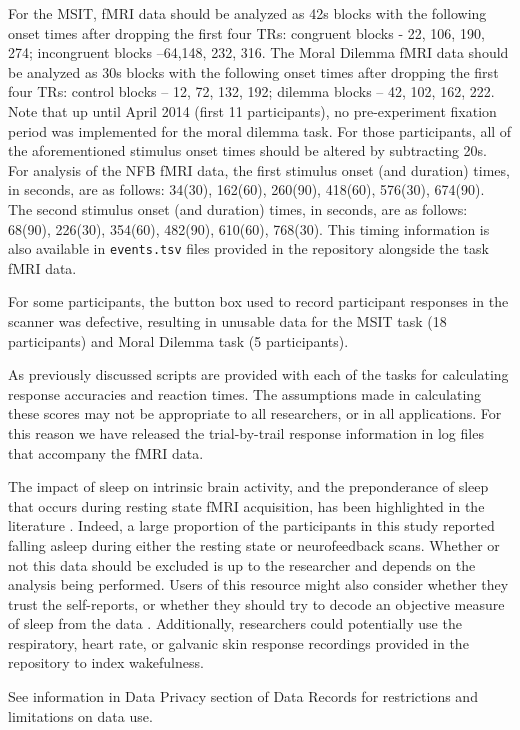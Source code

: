 For the MSIT, fMRI data should be analyzed as 42s blocks with the following onset times after dropping the first four TRs: congruent blocks - 22, 106, 190, 274; incongruent blocks –64,148, 232, 316. The Moral Dilemma fMRI data should be analyzed as 30s blocks with the following onset times after dropping the first four TRs: control blocks – 12, 72, 132, 192; dilemma blocks – 42, 102, 162, 222. Note that up until April 2014 (first 11 participants), no pre-experiment fixation period was implemented for the moral dilemma task. For those participants, all of the aforementioned stimulus onset times should be altered by subtracting 20s. For analysis of the NFB fMRI data, the first stimulus onset (and duration) times, in seconds, are as follows: 34(30), 162(60), 260(90), 418(60), 576(30), 674(90). The second stimulus onset (and duration) times, in seconds, are as follows: 68(90), 226(30), 354(60), 482(90), 610(60), 768(30). This timing information is also available in \texttt{events.tsv} files provided in the repository alongside the task fMRI data.

For some participants, the button box used to record participant responses in the scanner was defective, resulting in unusable data for the MSIT task (18 participants) and Moral Dilemma task (5 participants).

As previously discussed scripts are provided with each of the tasks for calculating response accuracies and reaction times. The assumptions made in calculating these scores may not be appropriate to all researchers, or in all applications. For this reason we have released the trial-by-trail response information in log files that accompany the fMRI data.

The  impact of sleep on intrinsic brain activity, and the preponderance of sleep that occurs during resting state fMRI acquisition, has been highlighted in the literature \cite{Duyn2011,Tagliazucchi2014}. Indeed, a large proportion of the participants in this study reported falling asleep during either the resting state or neurofeedback scans. Whether or not this data should be excluded is up to the researcher and depends on the analysis being performed. Users of this resource might also consider whether they trust the self-reports, or whether they should try to decode an objective measure of sleep from the data \cite{Tagliazucchi2014}. Additionally, researchers could potentially use the respiratory, heart rate, or galvanic skin response recordings provided in the repository to index wakefulness.

See information in Data Privacy section of Data Records for restrictions and limitations on data use.

